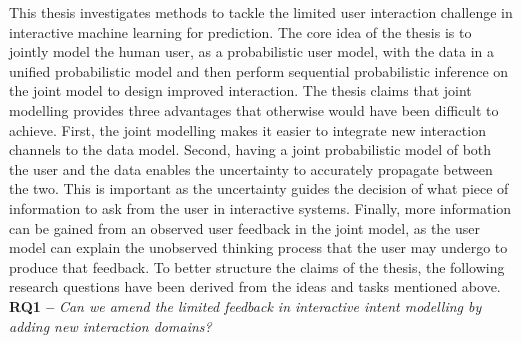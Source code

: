 \documentclass[dissertation,math,vertlayout,pdfa,colorlinks]{aaltoseries}
\begin{document}
This thesis investigates methods to tackle the limited user interaction challenge in interactive machine learning for prediction. The core idea of the thesis is to jointly model the human user, as a probabilistic user model, with the data in a unified probabilistic model and then perform sequential probabilistic inference on the joint model to design improved interaction. The thesis claims that joint modelling provides three advantages that otherwise would have been difficult to achieve. First, the joint modelling makes it easier to integrate new interaction channels to the data model. Second, having a joint probabilistic model of both the user and the data enables the uncertainty to accurately propagate between the two. This is important as the uncertainty guides the decision of what piece of information to ask from the user in interactive systems. Finally, more information can be gained from an observed user feedback in the joint model, as the user model can explain the unobserved thinking process that the user may undergo to produce that feedback. To better structure the claims of the thesis, the following research questions have been derived from the ideas and tasks mentioned above.\\



\noindent \textbf{RQ1 --} \textit{Can we amend the limited feedback in interactive intent modelling by adding new interaction domains?}
\end{document}
